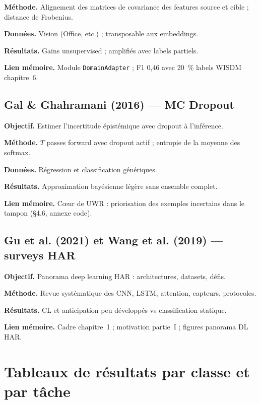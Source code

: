 \documentclass[a4paper,12pt]{report}
\begin{document}
\textbf{Méthode.} Alignement des matrices de covariance des features source et
cible ; distance de Frobenius.

\textbf{Données.} Vision (Office, etc.) ; transposable aux embeddings.

\textbf{Résultats.} Gains unsupervised ; amplifiés avec labels partiels.

\textbf{Lien mémoire.} Module \texttt{DomainAdapter} ; F1 0,46 avec 20~\% labels
WISDM chapitre~6.

\section{Gal \& Ghahramani (2016) — MC Dropout}

\textbf{Objectif.} Estimer l'incertitude épistémique avec dropout à l'inférence.

\textbf{Méthode.} $T$ passes forward avec dropout actif ; entropie de la moyenne
des softmax.

\textbf{Données.} Régression et classification génériques.

\textbf{Résultats.} Approximation bayésienne légère sans ensemble complet.

\textbf{Lien mémoire.} Cœur de UWR : priorisation des exemples incertains dans le
tampon (§4.6, annexe code).

\section{Gu et al. (2021) et Wang et al. (2019) — surveys HAR}

\textbf{Objectif.} Panorama deep learning HAR : architectures, datasets, défis.

\textbf{Méthode.} Revue systématique des CNN, LSTM, attention, capteurs, protocoles.

\textbf{Résultats.} CL et anticipation peu développés vs classification statique.

\textbf{Lien mémoire.} Cadre chapitre~1 ; motivation partie~I ; figures panorama
DL HAR.

\FloatBarrier



\chapter{Tableaux de résultats par classe et par tâche}
\label{app:perclass}
\end{document}
